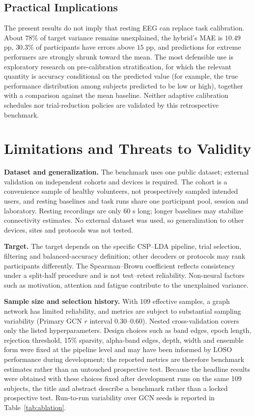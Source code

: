 \documentclass{ieeeaccess}
\begin{document}
\subsection{Practical Implications}

The present results do not imply that resting EEG can replace task calibration. About $78\%$ of target variance remains unexplained, the hybrid's MAE is $10.49$ pp, $30.3\%$ of participants have errors above $15$ pp, and predictions for extreme performers are strongly shrunk toward the mean. The most defensible use is exploratory research on pre-calibration stratification, for which the relevant quantity is accuracy conditional on the predicted value (for example, the true performance distribution among subjects predicted to be low or high), together with a comparison against the mean baseline. Neither adaptive calibration schedules nor trial-reduction policies are validated by this retrospective benchmark.

\section{Limitations and Threats to Validity}
\label{sec:limits}

\textbf{Dataset and generalization.} The benchmark uses one public dataset; external validation on independent cohorts and devices is required. The cohort is a convenience sample of healthy volunteers, not prospectively sampled intended users, and resting baselines and task runs share one participant pool, session and laboratory. Resting recordings are only 60 s long; longer baselines may stabilize connectivity estimates. No external dataset was used, so generalization to other devices, sites and protocols was not tested.

\textbf{Target.} The target depends on the specific CSP--LDA pipeline, trial selection, filtering and balanced-accuracy definition; other decoders or protocols may rank participants differently. The Spearman--Brown coefficient reflects consistency under a split-half procedure and is not test--retest reliability. Non-neural factors such as motivation, attention and fatigue contribute to the unexplained variance.

\textbf{Sample size and selection history.} With 109 effective samples, a graph network has limited reliability, and metrics are subject to substantial sampling variability (Primary GCN $r$ interval $0.30$--$0.60$). Nested cross-validation covers only the listed hyperparameters. Design choices such as band edges, epoch length, rejection threshold, 15\% sparsity, alpha-band edges, depth, width and ensemble form were fixed at the pipeline level and may have been informed by LOSO performance during development; the reported metrics are therefore benchmark estimates rather than an untouched prospective test. Because the headline results were obtained with these choices fixed after development runs on the same 109 subjects, the title and abstract describe a benchmark rather than a locked prospective test. Run-to-run variability over GCN seeds is reported in Table~\ref{tab:ablation}.
\end{document}
